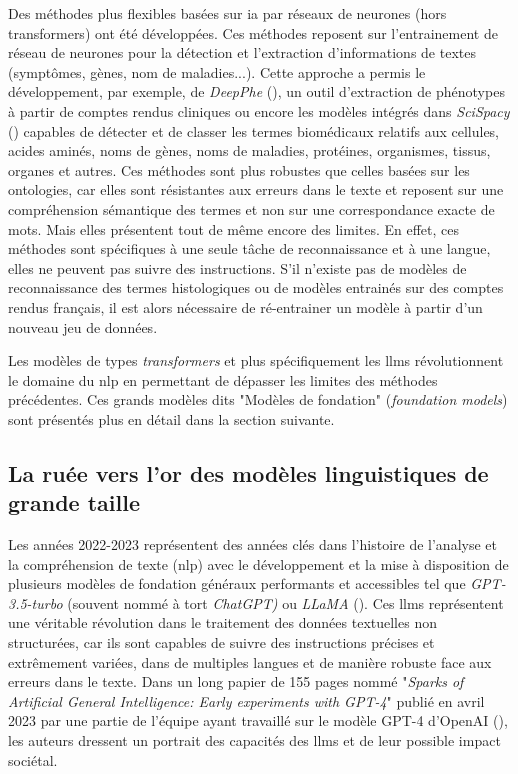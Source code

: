 Des méthodes plus flexibles basées sur \gls{ia} par réseaux de neurones (hors transformers) ont été développées. Ces méthodes reposent sur l'entrainement de réseau de neurones pour la détection et l'extraction d'informations de textes (symptômes, gènes, nom de maladies...). Cette approche a permis le développement, par exemple, de \textit{DeepPhe} (\cite{savova_deepphe_2017}), un outil d'extraction de phénotypes à partir de comptes rendus cliniques ou encore les modèles intégrés dans \textit{SciSpacy} (\cite{neumann_scispacy_2019}) capables de détecter et de classer les termes biomédicaux relatifs aux cellules, acides aminés, noms de gènes, noms de maladies, protéines, organismes, tissus, organes et autres. Ces méthodes sont plus robustes que celles basées sur les ontologies, car elles sont résistantes aux erreurs dans le texte et reposent sur une compréhension sémantique des termes et non sur une correspondance exacte de mots. Mais elles présentent tout de même encore des limites. En effet, ces méthodes sont spécifiques à une seule tâche de reconnaissance et à une langue, elles ne peuvent pas suivre des instructions. S’il n'existe pas de modèles de reconnaissance des termes histologiques ou de modèles entrainés sur des comptes rendus français, il est alors nécessaire de ré-entrainer un modèle à partir d'un nouveau jeu de données. 


Les modèles de types \textit{transformers} et plus spécifiquement les \gls{llms}  révolutionnent le domaine du \gls{nlp} en permettant de dépasser les limites des méthodes précédentes. Ces grands modèles dits "Modèles de fondation" (\textit{foundation models}) sont présentés plus en détail dans la section suivante.

\subsection{La ruée vers l'or des modèles linguistiques de grande taille}\label{chap2_llms}
Les années 2022-2023 représentent des années clés dans l’histoire de l'analyse et la compréhension de texte (\gls{nlp}) avec le développement et la mise à disposition de plusieurs modèles de fondation généraux performants et accessibles tel que \textit{GPT-3.5-turbo} (souvent nommé à tort \textit{ChatGPT)} ou \textit{LLaMA} (\cite{touvron_llama_2023}). Ces \gls{llms} représentent une véritable révolution dans le traitement des données textuelles non structurées, car ils sont capables de suivre des instructions précises et extrêmement variées, dans de multiples langues et de manière robuste face aux erreurs dans le texte. Dans un long papier de 155 pages nommé "\textit{Sparks of Artificial General Intelligence: Early experiments with GPT-4}" publié en avril 2023 par une partie de l'équipe ayant travaillé sur le modèle GPT-4 d'OpenAI (\cite{bubeck_sparks_2023}), les auteurs dressent un portrait des capacités des \gls{llms} et de leur possible impact sociétal.


